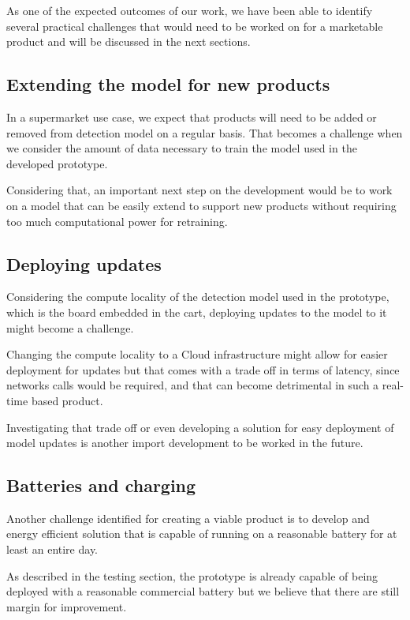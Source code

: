 As one of the expected outcomes of our work, we have been able to identify
several practical challenges that would need to be worked on for a marketable
product and will be discussed in the next sections.

\subsection{Extending the model for new products}
In a supermarket use case, we expect that products will need to be added or
removed from detection model on a regular basis. That becomes a challenge when
we consider the amount of data necessary to train the model used in the
developed prototype.

Considering that, an important next step on the development would be to work on
a model that can be easily extend to support new products without requiring too
much computational power for retraining.

\subsection{Deploying updates}

Considering the compute locality of the detection model used in the prototype,
which is the board embedded in the cart, deploying updates to the model to it
might become a challenge.

Changing the compute locality to  a Cloud infrastructure \cite{Aws2022} might
allow for easier deployment for updates but that comes with a trade off in
terms of latency, since networks calls would be required, and that can become
detrimental in such a real-time based product.

Investigating that trade off or even developing a solution for easy deployment
of model updates is another import development to be worked in the future. 

\subsection{Batteries and charging}

Another challenge identified for creating a viable product is to develop and
energy efficient solution that is capable of running on a reasonable battery
for at least an entire day.

As described in the testing section, the prototype is already capable of being
deployed with a reasonable commercial battery but we believe that there are
still margin for improvement.


